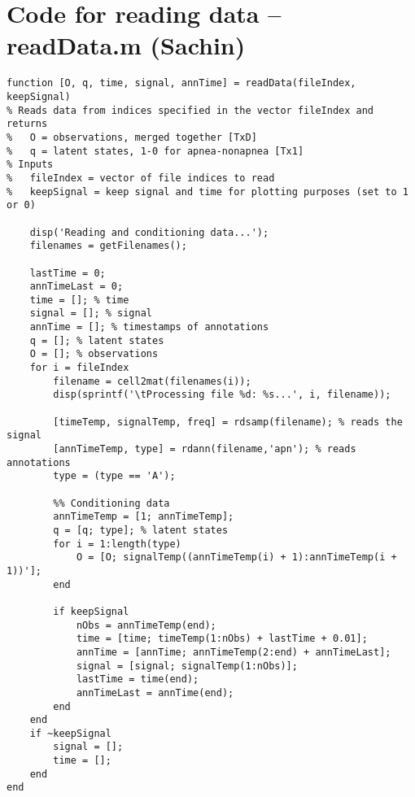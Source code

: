 \chapter{Code for reading data -- readData.m (Sachin)}
\label{ch:readingDataCode}
\begin{lstlisting}
function [O, q, time, signal, annTime] = readData(fileIndex, keepSignal)
% Reads data from indices specified in the vector fileIndex and returns
%   O = observations, merged together [TxD]
%   q = latent states, 1-0 for apnea-nonapnea [Tx1]
% Inputs
%   fileIndex = vector of file indices to read
%   keepSignal = keep signal and time for plotting purposes (set to 1 or 0)
    
    disp('Reading and conditioning data...');
    filenames = getFilenames();
    
    lastTime = 0;
    annTimeLast = 0;
    time = []; % time
    signal = []; % signal
    annTime = []; % timestamps of annotations
    q = []; % latent states
    O = []; % observations
    for i = fileIndex
        filename = cell2mat(filenames(i));
        disp(sprintf('\tProcessing file %d: %s...', i, filename));
        
        [timeTemp, signalTemp, freq] = rdsamp(filename); % reads the signal
        [annTimeTemp, type] = rdann(filename,'apn'); % reads annotations
        type = (type == 'A');

        %% Conditioning data
        annTimeTemp = [1; annTimeTemp];
        q = [q; type]; % latent states
        for i = 1:length(type)
            O = [O; signalTemp((annTimeTemp(i) + 1):annTimeTemp(i + 1))'];
        end
        
        if keepSignal
            nObs = annTimeTemp(end);
            time = [time; timeTemp(1:nObs) + lastTime + 0.01];
            annTime = [annTime; annTimeTemp(2:end) + annTimeLast];
            signal = [signal; signalTemp(1:nObs)];
            lastTime = time(end);
            annTimeLast = annTime(end);
        end
    end
    if ~keepSignal
        signal = [];
        time = [];
    end
end
\end{lstlisting}